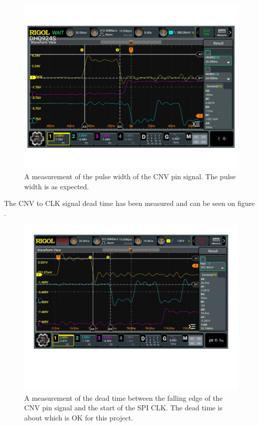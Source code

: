 \begin{figure}[H]
    \centering
    \includegraphics[clip, trim=0 75 0 0, width=1\textwidth]{Appendix/Figures/A_ADCControl_CNV_MEASURE.pdf}
    \caption{A measurement of the pulse width of the CNV pin signal. The pulse width is  as expected.}
    \label{fig:A_ADC_CONTROL_CNV}
\end{figure}

The CNV to CLK signal dead time has been measured and can be seen on figure .

\begin{figure}[H]
    \centering
    \includegraphics[clip, trim=0 150 0 0, width=1\textwidth]{Appendix/Figures/A_ADC_CONTROL_DCN_MEAS.pdf}
    \caption{A measurement of the dead time between the falling edge of the CNV pin signal and the start of the SPI CLK. The dead time is about  which is OK for this project.}
    \label{fig:A_ADC_CONTROL_DCN}
\end{figure}

